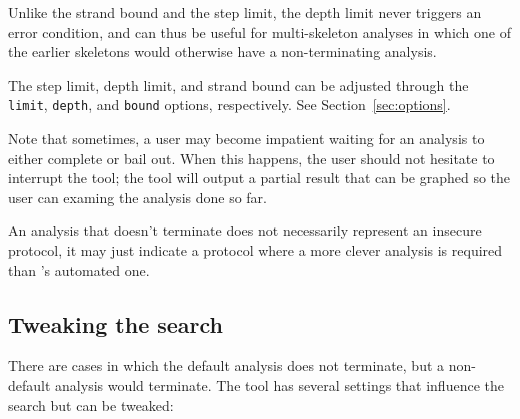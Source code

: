 Unlike the strand bound and the step limit, the depth limit never
triggers an error condition, and can thus be useful for multi-skeleton
analyses in which one of the earlier skeletons would otherwise have a
non-terminating analysis.

The step limit, depth limit, and strand bound can be adjusted through the
\texttt{limit}, \texttt{depth}, and \texttt{bound} options, respectively.  See
Section~\ref{sec:options}.

Note that sometimes, a user may become impatient waiting for an
analysis to either complete or bail out.  When this happens, the user should
not hesitate to interrupt the tool; the tool will output a partial result that can
be graphed so the user can examing the analysis done so far.

An analysis that doesn't terminate does not necessarily represent an
insecure protocol, it may just indicate a protocol where a more clever
analysis is required than {\cpsa}'s automated one.

\subsection{Tweaking the search}
There are cases in which the default {\cpsa} analysis does not
terminate, but a non-default analysis would terminate.  The tool has
several settings that influence the search but can be tweaked:

